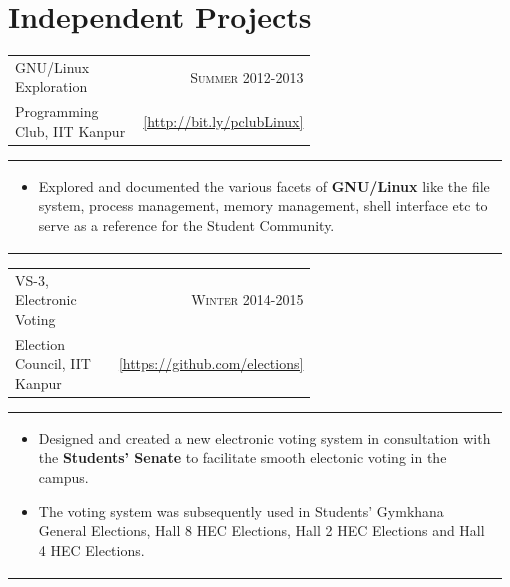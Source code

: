 \documentclass[a4paper]{article} %
\newcommand{\verticalspacing}{-0.25cm}
\newcommand{\bulletspace}{0.7cm}
\newcommand{\cproject}[5]{
    \begin{tabular}{p{0.60\linewidth}r}
        \textcolor{NavyBlue}{\small #2} & \multicolumn{1}{m{7.3cm}}{\raggedleft \small {\textsc{#1}}}\\
        \small {#3} & \small {#4}
    \end{tabular}
    \begin{tabular}{p{0.98\linewidth}}
    \vspace{-0.3cm}
        \small{#5}
    \end{tabular}
    \vspace{\verticalspacing{}}
}
\begin{document}
\section{Independent Projects}

\cproject
    {Summer 2012-2013}
    {GNU/Linux Exploration}
    {Programming Club, IIT Kanpur}
    {\href{http://bit.ly/pclubLinux}{\small{[http://bit.ly/pclubLinux]}}}
    {
        \begin{itemize}[leftmargin=\bulletspace{}]
            \item Explored and documented the various facets of \textbf{GNU/Linux} like the file system,
                process management, memory management, shell interface etc to serve as a reference for the
                Student Community.
        \end{itemize}
    }

\cproject
    {Winter 2014-2015}
    {VS-3, Electronic Voting}
    {Election Council, IIT Kanpur}
    {\href{https://github.com/srijanshetty/elections} {\small{[https://github.com/elections]}}}
    {
        \begin{itemize}[leftmargin=\bulletspace{}]
            \item Designed and created a new electronic voting system in consultation with the \textbf{Students' Senate}
                to facilitate smooth electonic voting in the campus.
            \item The voting system was subsequently used in Students'
                Gymkhana General Elections, Hall 8 HEC Elections, Hall 2 HEC Elections and Hall 4 HEC Elections.
        \end{itemize}
    }
\end{document}
